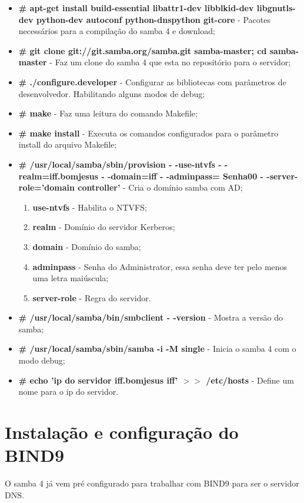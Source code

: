 \begin{itemize}
	\item \textbf{\# apt-get install build-essential libattr1-dev libblkid-dev libgnutls-dev python-dev autoconf python-dnspython git-core} - Pacotes necessários para a compilação do samba 4 e download;
	\item \textbf{\# git clone git://git.samba.org/samba.git samba-master; cd samba-master} - Faz um clone do samba 4 que esta no repositório para o servidor;
	\item \textbf{\# ./configure.developer} - Configurar as bibliotecas com parâmetros de desenvolvedor. Habilitando alguns modos de debug;
	\item \textbf{\# make} - Faz uma leitura do comando Makefile;
	\item \textbf{\# make install} - Executa os comandos configurados para o parâmetro install do arquivo Makefile;
	\item \textbf{\# /usr/local/samba/sbin/provision - -use-ntvfs - -realm=iff.bomjesus - -domain=iff  - -adminpass= Senha00 - -server-role='domain controller'} - Cria o domínio samba com AD;
		\begin{enumerate}
			\item \textbf{use-ntvfs} - Habilita o NTVFS;
			\item \textbf{realm} - Domínio do servidor Kerberos;
			\item \textbf{domain} - Domínio do samba;
			\item \textbf{adminpass} - Senha do Administrator, essa senha deve ter pelo menos uma letra maiúscula;
			\item \textbf{server-role} - Regra do servidor.
		\end{enumerate}
	\item \textbf{\# /usr/local/samba/bin/smbclient - -version} - Mostra a versão do samba;
	\item \textbf{\# /usr/local/samba/sbin/samba -i -M single} - Inicia o samba 4 com o modo debug;
	\item \textbf{\#  echo 'ip do servidor iff.bomjesus iff' $>$$>$ /etc/hosts} - Define um nome para o ip do servidor.
\end{itemize}

\section{Instalação e configuração do BIND9}

O samba 4 já vem pré configurado para trabalhar com BIND9 para ser o servidor DNS.

